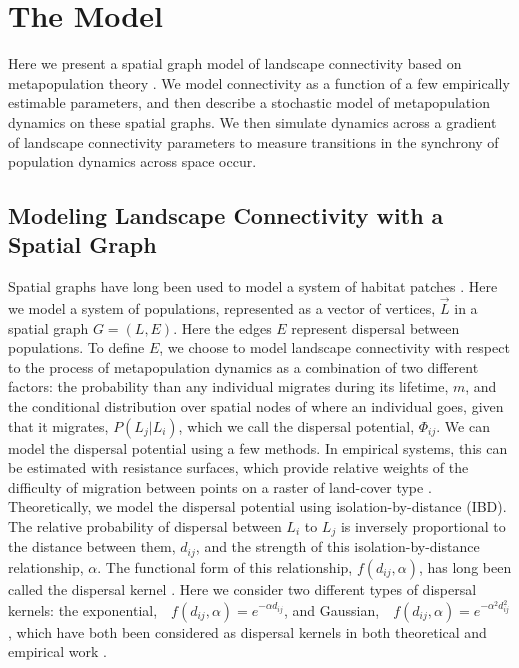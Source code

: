 \documentclass[]{article}
\begin{document}
\pagebreak

\hypertarget{the-model}{
\section{The Model}\label{the-model}}

Here we present a spatial graph model of landscape connectivity based on
metapopulation theory \cite{hanski_practical_1994, grilli_metapopulation_2015} . We model connectivity as a function of
a few empirically estimable parameters, and then describe a stochastic
model of metapopulation dynamics on these spatial graphs. We then
simulate dynamics across a gradient of landscape
connectivity parameters to measure transitions in the synchrony of
population dynamics across space occur.

\hypertarget{modeling-landscape-connectivity-with-a-spatial-graph}{%
\subsection{Modeling Landscape Connectivity with a Spatial
Graph}\label{modeling-landscape-connectivity-with-a-spatial-graph}}

Spatial graphs have long been used to model a system of habitat patches
\cite{dale_graphs_2010, minor_graph-theory_2008,
urban_landscape_2001}. Here we model a system of populations, represented as a vector of
vertices, $\vec{L}$ in a spatial graph \(G=(L,E)\). Here the edges \(E\)  represent dispersal between populations. To define $E$,  we choose to model landscape connectivity with respect to the process of metapopulation dynamics as a combination of two different factors: the probability than any individual migrates during its lifetime, $m$, and the conditional distribution over spatial nodes of where an individual goes, given that
it migrates, \(P(L_j|L_i)\), which we call the dispersal potential, $\Phi_{ij}$. We can model the dispersal potential using a few methods. In empirical
systems, this can be estimated with resistance surfaces, which provide
relative weights of the difficulty of migration between points on a
raster of land-cover type \cite{spear_use_2010}. Theoretically, we model
the dispersal potential using isolation-by-distance (IBD). The relative
probability of dispersal between \(L_i\) to \(L_j\) is inversely
proportional to the distance between them, \(d_{ij}\), and the strength
of this isolation-by-distance relationship, \(\alpha\). The
functional form of this relationship, \(f(d_{ij}, \alpha)\), has long been called the dispersal kernel \cite{hanski_practical_1994}.
Here we consider two different types of dispersal kernels: the
exponential, \(f(d_{ij}, \alpha)=e^{-\alpha d_{ij}}\), and
Gaussian, \(f(d_{ij}, \alpha)=e^{-\alpha^2 d_{ij}^2}\), which have both been considered as dispersal kernels in both theoretical and empirical work \cite{hanski_practical_1994,grilli_metapopulation_2015}.
\end{document}
